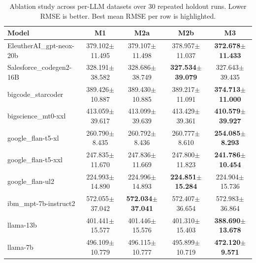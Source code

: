 \begin{table}[t]
\centering
\small
\caption{Ablation study across per-LLM datasets over 30 repeated holdout runs. Lower RMSE is better. Best mean RMSE per row is highlighted.}
\label{tab:ablation_rmse}
\begin{tabular}{lcccc}
\toprule
Model & M1 & M2a & M2b & M3 \\
\midrule
EleutherAI\_gpt-neox-20b & 379.102$\pm$11.495 & 379.107$\pm$11.498 & 378.957$\pm$11.037 & \textbf{372.678$\pm$11.433} \\
Salesforce\_codegen2-16B & 328.191$\pm$38.582 & 328.686$\pm$38.749 & \textbf{327.534$\pm$39.079} & 327.643$\pm$39.435 \\
bigcode\_starcoder & 389.426$\pm$10.887 & 389.430$\pm$10.885 & 389.217$\pm$11.091 & \textbf{374.713$\pm$11.000} \\
bigscience\_mt0-xxl & 413.059$\pm$39.617 & 413.099$\pm$39.639 & 413.429$\pm$39.361 & \textbf{410.579$\pm$39.927} \\
google\_flan-t5-xl & 260.790$\pm$8.435 & 260.792$\pm$8.436 & 260.777$\pm$8.610 & \textbf{254.085$\pm$8.293} \\
google\_flan-t5-xxl & 247.835$\pm$11.670 & 247.836$\pm$11.669 & 247.800$\pm$11.823 & \textbf{241.786$\pm$10.454} \\
google\_flan-ul2 & 224.993$\pm$14.890 & 224.996$\pm$14.893 & \textbf{224.851$\pm$15.284} & 224.904$\pm$15.736 \\
ibm\_mpt-7b-instruct2 & 572.055$\pm$37.042 & \textbf{572.034$\pm$37.041} & 572.407$\pm$36.654 & 572.983$\pm$36.864 \\
llama-13b & 401.441$\pm$15.577 & 401.446$\pm$15.576 & 401.310$\pm$15.403 & \textbf{388.690$\pm$13.678} \\
llama-7b & 496.109$\pm$10.779 & 496.115$\pm$10.777 & 495.899$\pm$10.719 & \textbf{472.120$\pm$9.571} \\
\bottomrule
\end{tabular}
\end{table}